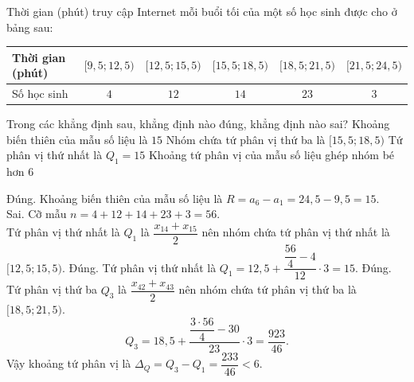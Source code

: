 \begin{ex}%
	Thời gian (phút) truy cập Internet mỗi buổi tối của một số học sinh được cho ở bảng sau:
	\begin{center}
		\begin{tabular}{|>{\centering\arraybackslash}m{3cm}|c|c|c|c|c|}
			\hline
			Thời gian (phút) & $[9{,}5; 12{,}5)$ & $[12{,}5; 15{,}5)$ & $[15{,}5; 18{,}5)$ & $[18{,}5; 21{,}5)$ & $[21{,}5; 24{,}5)$ \\ \hline
			Số học sinh & $4$ & $12$ & $14$ & $23$ & $3$ \\ \hline
		\end{tabular}
	\end{center}
	Trong các khẳng định sau, khẳng định nào đúng, khẳng định nào sai?
	\choiceTF
	{\True Khoảng biến thiên của mẫu số liệu là $15$}
	{Nhóm chứa tứ phân vị thứ ba là $[15{,}5; 18{,}5)$}
	{\True Tứ phân vị thứ nhất là $Q_1 = 15$}
	{\True Khoảng tứ phân vị của mẫu số liệu ghép nhóm bé hơn $6$}
	\loigiai
	{
		\begin{itemchoice}
			\itemch Đúng. Khoảng biến thiên của mẫu số liệu là $R = a_6 - a_1 = 24{,}5 - 9{,}5 = 15$. \\
			\itemch Sai. Cỡ mẫu $n = 4 + 12 + 14 + 23 + 3= 56$. \\
			Tứ phân vị thứ nhất là $Q_1$ là $\dfrac{x_{14} + x_{15}}{2}$ nên nhóm chứa tứ phân vị thứ nhất là $[12{,}5; 15{,}5)$. 
			\itemch Đúng. Tứ phân vị thứ nhất là $Q_1 = 12{,}5 + \dfrac{\dfrac{56}{4} - 4}{12} \cdot 3 = 15$.
			\itemch Đúng. Tứ phân vị thứ ba $Q_3$ là $\dfrac{x_{42} + x_{43}}{2}$ nên nhóm chứa tứ phân vị thứ ba là $[18{,}5; 21{,}5)$.
			\[Q_3 = 18{,}5 + \dfrac{\dfrac{3 \cdot 56}{4} - 30}{23} \cdot 3 = \dfrac{923}{46}.\] 
			Vậy khoảng tứ phân vị là $\Delta_Q = Q_3 - Q_1 = \dfrac{233}{46} < 6$.
		\end{itemchoice}
	}
\end{ex}


